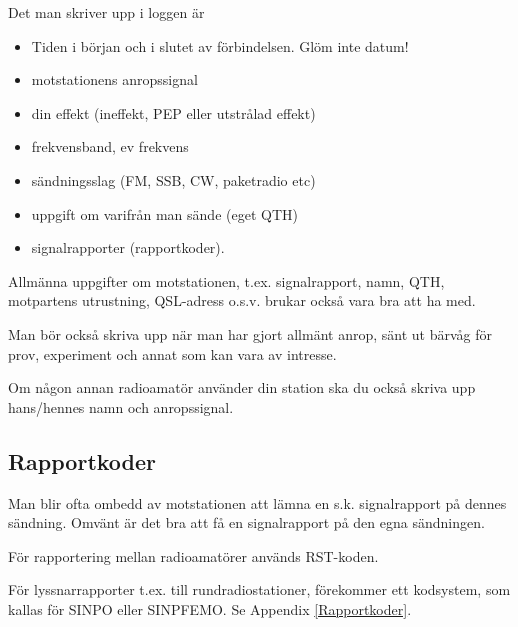 Det man skriver upp i loggen är
\begin{itemize}
  \item Tiden i början och i slutet av förbindelsen. Glöm inte datum!
  \item motstationens anropssignal
  \item din effekt (ineffekt, PEP eller utstrålad effekt)
  \item frekvensband, ev frekvens
  \item sändningsslag (FM, SSB, CW, paketradio etc)
  \item uppgift om varifrån man sände (eget QTH)
  \item signalrapporter (rapportkoder).
\end{itemize}

Allmänna uppgifter om motstationen, t.ex. signalrapport, namn, QTH,
motpartens utrustning, QSL-adress o.s.v. brukar också vara bra att ha
med.

Man bör också skriva upp när man har gjort allmänt anrop, sänt ut
bärvåg för prov, experiment och annat som kan vara av intresse.

Om någon annan radioamatör använder din station ska du också skriva
upp hans/hennes namn och anropssignal.

\subsection{Rapportkoder}

Man blir ofta ombedd av motstationen att lämna en s.k. signalrapport
på dennes sändning. Omvänt är det bra att få en signalrapport på den
egna sändningen.

För rapportering mellan radioamatörer används RST-koden.

För lyssnarrapporter t.ex. till rundradiostationer, förekommer ett
kodsystem, som kallas för SINPO eller SINPFEMO. Se Appendix \ref{Rapportkoder}.

